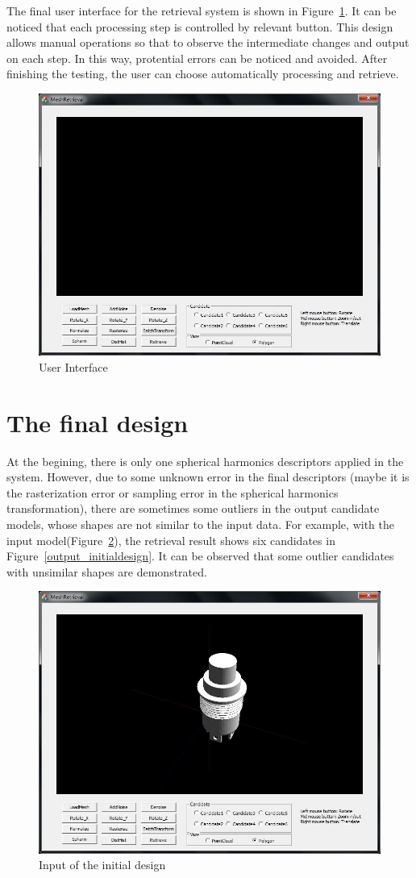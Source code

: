 The final user interface for the retrieval system is shown in Figure~\ref{UI}. It can be noticed that each processing step is controlled by relevant button. This design allows manual operations so that to observe the intermediate changes and output on each step. In this way, protential errors can be noticed and avoided. After finishing the testing, the user can choose automatically processing and retrieve.

\begin{figure}[h]
\centering
\includegraphics[width=0.7\linewidth]{UI}
\caption{User Interface} \label{UI}
\end{figure}

\section{The final design} \label{sec:thefinaldesign}

At the begining, there is only one spherical harmonics descriptors applied in the system. However, due to some unknown error in the final descriptors (maybe it is the rasterization error or sampling error in the spherical harmonics transformation), there are sometimes some outliers in the output candidate models, whose shapes are not similar to the input data. For example, with the input model(Figure~\ref{input_initialdesign}), the retrieval result shows six candidates in Figure~\ref{output_initialdesign}. It can be observed that some outlier candidates with unsimilar shapes are demonstrated. 


\begin{figure}[h]
\centering
\includegraphics[width=0.7\linewidth]{input_initialdesign}
\caption{Input of the initial design} \label{input_initialdesign}
\end{figure}

